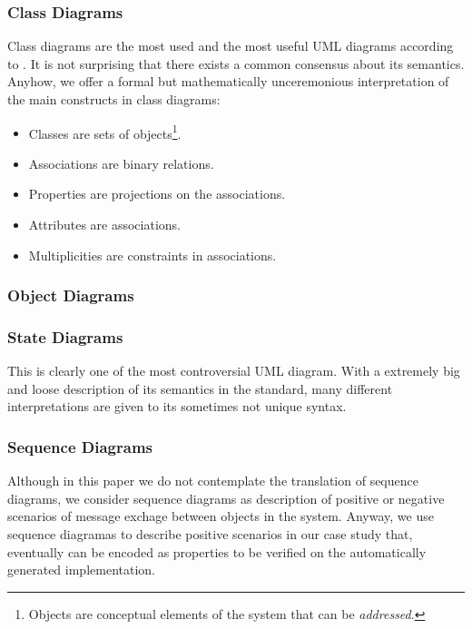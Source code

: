 \subsubsection{Class Diagrams}
Class diagrams are the most used and the most useful UML diagrams
according to \cite{Dobing:2006:UU:1125944.1125949}. It is not
surprising that there exists a common consensus about its
semantics. Anyhow, we offer a formal but mathematically unceremonious interpretation of the main constructs in class diagrams:
\begin{itemize}
\item Classes are sets of objects\footnote{Objects are conceptual
    elements of the system that can be
    \emph{addressed}.}.
\item Associations are binary relations.
\item Properties are projections on the associations.
\item Attributes are associations.
\item Multiplicities are constraints in associations.
\end{itemize}


\subsubsection{Object Diagrams}

\subsubsection{State Diagrams}
This is clearly one of the most controversial UML diagram. With a
extremely big and loose description of its semantics in the standard,
many different interpretations are given to its sometimes not unique
syntax.



\subsubsection{Sequence Diagrams}
Although in this paper we do not contemplate the translation of
sequence diagrams, we consider sequence diagrams as description of
positive or negative scenarios of message exchage between objects in
the system. Anyway, we use sequence diagramas to describe positive
scenarios in our case study that, eventually can be encoded as
properties to be verified on the automatically generated
implementation.

